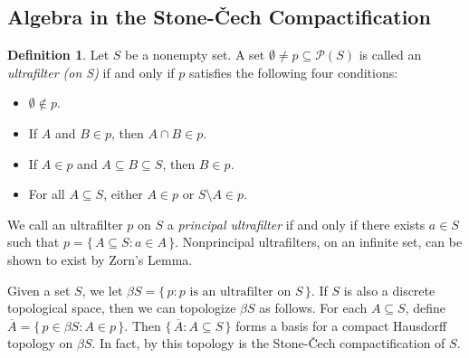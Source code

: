 \documentclass[12pt]{article}
\theoremstyle{plain}
\theoremstyle{definition}
\newtheorem{defn}[thm]{Definition}
\newcommand{\calP}{\mathcal{P}}
\begin{document}
\subsection{Algebra in the Stone-\v{C}ech Compactification}
\begin{defn}
  Let $S$ be a nonempty set.
  A set $\emptyset \ne p \subseteq \calP(S)$ is called an
  \textsl{ultrafilter (on S)} if and only if $p$ satisfies the
  following four conditions:
  \begin{itemize}
    \item[(1)] $\emptyset \not\in p$.
    \item[(2)] If $A$ and $B \in p$, then $A \cap B \in p$.
    \item[(3)] If $A \in p$ and $A \subseteq B \subseteq S$, then $B
      \in p$.
    \item[(4)] For all $A \subseteq S$, either $A \in p$ or $S
      \setminus A \in p$. 
  \end{itemize}
\end{defn}
We call an ultrafilter $p$ on $S$ a \textsl{principal ultrafilter} if and
only if there exists $a \in S$ such that $p = \{\, A \subseteq S : a
\in A \,\}$.
Nonprincipal ultrafilters, on an infinite set, can be shown to exist
by Zorn's Lemma.%

Given a set $S$, we let $\beta S = \{\, p : \mbox{$p$ is an
  ultrafilter on $S$} \,\}$.
If $S$ is also a discrete topological space, then we can topologize
$\beta S$ as follows. 
For each $A \subseteq S$, define $\overline{A} = \{\, p \in \beta S :
A \in p \,\}$. 
Then $\{\, \overline{A} : A \subseteq S \,\}$ forms a basis for a
compact Hausdorff
topology on $\beta S$.
In fact, by \cite[Theorem 3.27]{Hindman:1998fk} this topology is the
Stone-\v{C}ech compactification of $S$. 
\end{document}
